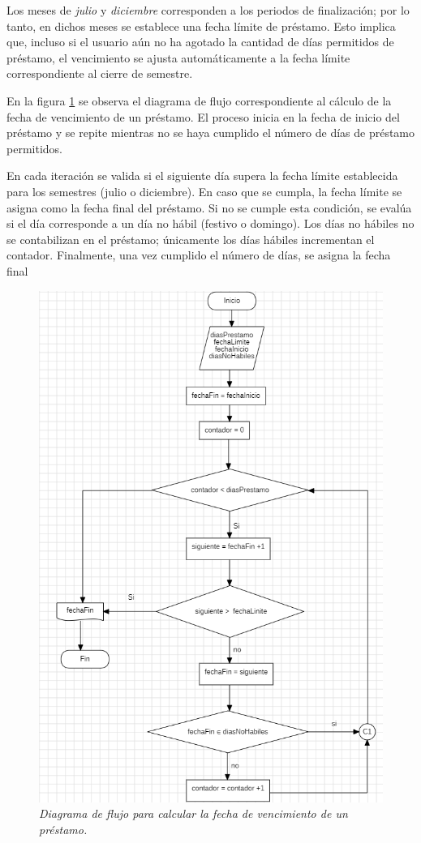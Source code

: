 \documentclass[spanish]{ieee_upb}
\begin{document}
Los meses de \textit{julio} y \textit{diciembre} corresponden a los periodos de finalización; por lo tanto, en dichos meses se establece una fecha límite de préstamo. Esto implica que, incluso si el usuario aún no ha agotado la cantidad de días permitidos de préstamo, el vencimiento se ajusta automáticamente a la fecha límite correspondiente al cierre de semestre.
\vspace{0.3 cm}

En la figura \ref{fig:diagramaFlujoCalculoDias} se observa el diagrama de flujo correspondiente al cálculo de la fecha de vencimiento de un préstamo. El proceso inicia en la fecha de inicio del préstamo y se repite mientras no se haya cumplido el número de días de préstamo permitidos.
\vspace{0.3 cm}

En cada iteración se valida si el siguiente día supera la fecha límite establecida para los semestres (julio o diciembre). En caso que se cumpla,  la fecha límite se asigna como la fecha final del préstamo. Si no se cumple esta condición, se evalúa si el día corresponde a un día no hábil (festivo o domingo). Los días no hábiles no se contabilizan en el préstamo; únicamente los días hábiles incrementan el contador. Finalmente, una vez cumplido el número de días, se asigna la fecha final

 \begin{figure}[H] 
	\centering
	\includegraphics[width=0.6\linewidth]{img/diagramaFlujoClaculoDias.png}
	\vspace{-1mm}
	\caption[Diagrama de Flujo: Cálculo de la fecha de vencimiento ]{\textit{Diagrama de flujo para calcular la fecha de vencimiento de un préstamo.}}
	\label{fig:diagramaFlujoCalculoDias} 
\end{figure}
\end{document}
